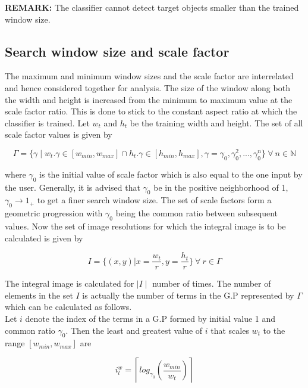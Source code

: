 \textbf{REMARK:} The classifier cannot detect target objects smaller than the trained window size. 

\subsection{Search window size and scale factor}

The maximum and minimum window sizes and the scale factor are interrelated and hence considered together for analysis. The size of the window along both the width and height is increased from the minimum to maximum value at the scale factor ratio. This is done to stick to the constant aspect ratio at which the classifier is trained. Let $w_t$ and $h_t$ be the training width and height. The set of all scale factor values is given by

\begin{equation}
\Gamma = \{ \gamma \mid w_t.\gamma \in [w_{min}, w_{max}] \cap h_t.\gamma \in [h_{min}, h_{max}], \gamma = \gamma_0, \gamma_0^2, ... ,\gamma_0^n\} \  \forall \ n \in \mathbb{N}     
\label{eq1}
\end{equation} 

where $\gamma_0$ is the initial value of scale factor which is also equal to the one input by the user. Generally, it is advised that $\gamma_0$ be in the positive neighborhood of 1, $\gamma_0 \rightarrow 1_+$ to get a finer search window size. The set of scale factors form a geometric progression with $\gamma_0$ being the common ratio between subsequent values. Now the set of image resolutions for which the integral image is to be calculated is given by 

\begin{equation}
I = \{ (x, y) | x = \frac{w_t}{r}, y = \frac{h_t}{r}\} \ \forall \ r \in \Gamma
\label{eq2}
\end{equation} 


\noindent
The integral image is calculated for $\mid I \mid$ number of times. The number of elements in the set $I$ is actually the number of terms in the G.P represented by $\Gamma$ which can be calculated as follows. \\

\noindent
Let $i$ denote the index of the terms in a G.P formed by initial value 1 and common ratio $\gamma_0$. Then the least and greatest value of $i$ that scales $w_t$ to the range $[w_{min}, w_{max}]$ are 

\begin{equation}
i^w_l = \left \lceil log_{\gamma_0} \left ( \frac{w_{min}}{w_t} \right ) \right \rceil
\label{eq3}
\end{equation}

